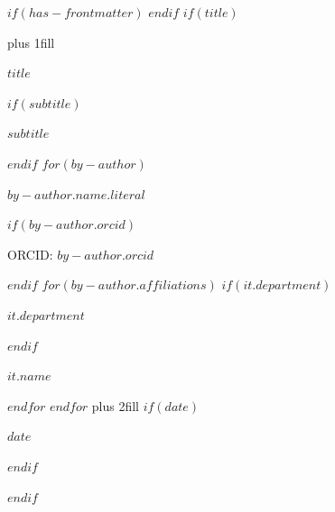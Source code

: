 $if(has-frontmatter)$
    \frontmatter
$endif$
$if(title)$
\cleardoublepage
\thispagestyle{empty}
{\centering
    \hbox{}\vskip 0cm plus 1fill
    {\Huge\bfseries $title$ \par}
    $if(subtitle)$
        \vspace{3ex}
        {\Large\bfseries $subtitle$ \par}
    $endif$
        \vspace{12ex}
    $for(by-author)$
        {\Large\bfseries $by-author.name.literal$ \par}
        $if(by-author.orcid)$
            \vspace{1ex}
            {\Large ORCID: $by-author.orcid$ \par}
        $endif$
        $for(by-author.affiliations)$%
            \vspace{2ex}
            $if(it.department)$%
                {\large $it.department$ \par}
                \vspace{1ex}
            $endif$%
            {\large $it.name$ \par}
        $endfor$%
        \vspace{3ex}
    $endfor$
    \vskip 0cm plus 2fill
    $if(date)$
        {\bfseries\large $date$ \par}
    $endif$
}
$endif$
